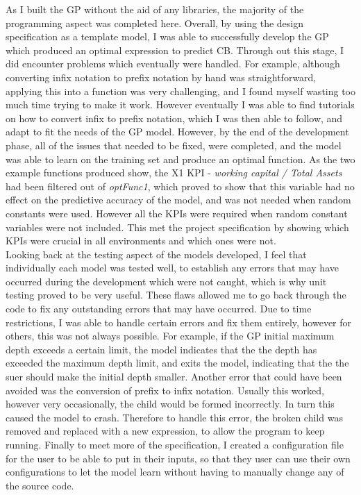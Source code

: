 \documentclass[11pt]{article}
\begin{document}
As I built the GP without the aid of any libraries, the majority of the programming aspect was completed here. Overall, by using the design specification as a template model, I was able to successfully develop the GP which produced an optimal expression to predict CB. Through out this stage, I did encounter problems which eventually were handled. For example, although converting infix notation to prefix notation by hand was straightforward, applying this into a function was very challenging, and I found myself wasting too much time trying to make it work. However eventually I was able to find tutorials on how to convert infix to prefix notation, which I was then able to follow, and adapt to fit the needs of the GP model. However, by the end of the development phase, all of the issues that needed to be fixed, were completed, and the model was able to learn on the training set and produce an optimal function. As the two example functions produced show, the X1 KPI - \textit{working capital / Total Assets} had been filtered out of \textit{optFunc1}, which proved to show that this variable had no effect on the predictive accuracy of the model, and was not needed when random constants were used. However all the KPIs were required when random constant variables were not included. This met the project specification by showing which KPIs were crucial in all environments and which ones were not.\\

Looking back at the testing aspect of the models developed, I feel that individually each model was tested well, to establish any errors that may have occurred during the development which were not caught, which is why unit testing proved to be very useful. These flaws allowed me to go back through the code to fix any outstanding errors that may have occurred. Due to time restrictions, I was able to handle certain errors and fix them entirely, however for others, this was not always  possible. For example, if the GP initial maximum depth exceeds a certain limit, the model indicates that the the depth has exceeded the maximum depth limit, and exits the model, indicating that the the suer should make the initial depth smaller. Another error that could have been avoided was the conversion of prefix to infix notation. Usually this worked, however very occasionally, the child would be formed incorrectly. In turn this caused the model to crash. Therefore to handle this error, the broken child was removed and replaced with a new expression, to allow the program to keep running. Finally to meet more of the specification, I created a configuration file for the user to be able to put in their inputs, so that they user can use their own configurations to let the model learn without having to manually change any of the source code. 
\end{document}
